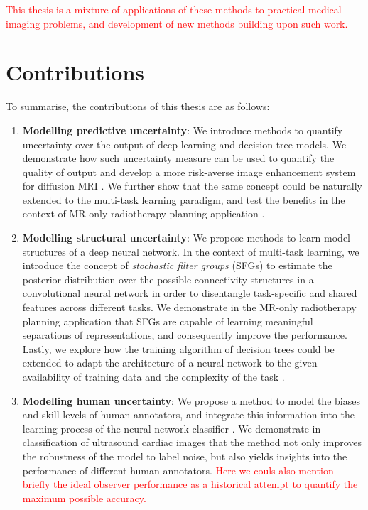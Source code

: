 \textcolor{red}{This thesis is a mixture of applications of these methods to practical medical imaging problems, and development of new methods building upon such work. }


\section{Contributions} 
To summarise, the contributions of this thesis are as follows:

\begin{enumerate}
	\item \textbf{Modelling predictive uncertainty}:  We introduce methods to quantify uncertainty over the output of deep learning and decision tree models. We demonstrate how such uncertainty measure can be used to quantify the quality of output and develop a more risk-averse image enhancement system for diffusion MRI \cite{tanno2016bayesian,tanno2017bayesian,tannonimg2019}.  We further show that the same concept could be naturally extended to the multi-task learning paradigm, and test the benefits in the context of MR-only radiotherapy planning application \cite{bragman2018multi}. 
	
	\item \textbf{Modelling structural uncertainty}: We propose methods to learn model structures of a deep neural network. In the context of multi-task learning, we introduce the concept of \emph{stochastic filter  groups} (SFGs) \cite{sfg2019} to estimate the posterior distribution over the possible connectivity structures in a convolutional neural network in order to disentangle task-specific and shared features across different tasks. We demonstrate in the MR-only radiotherapy planning application that SFGs are capable of learning meaningful separations of representations, and consequently improve the performance. Lastly, we explore how the training algorithm of decision trees could be extended to adapt the architecture of a neural network to the given availability of training data and the complexity of the task \cite{AdaptiveNeuralTrees19}. 
	
	\item \textbf{Modelling human uncertainty}: We propose a method to model the biases and skill levels of human annotators, and integrate this information into the learning process of the neural network classifier \cite{tanno2019learning}. We demonstrate in classification of ultrasound cardiac images that the method not only improves the robustness of the model to label noise, but also yields insights into the performance of different human annotators. \textcolor{red}{Here we couls also mention briefly the ideal observer performance as a historical attempt to quantify the maximum possible accuracy.}
	
\end{enumerate}

